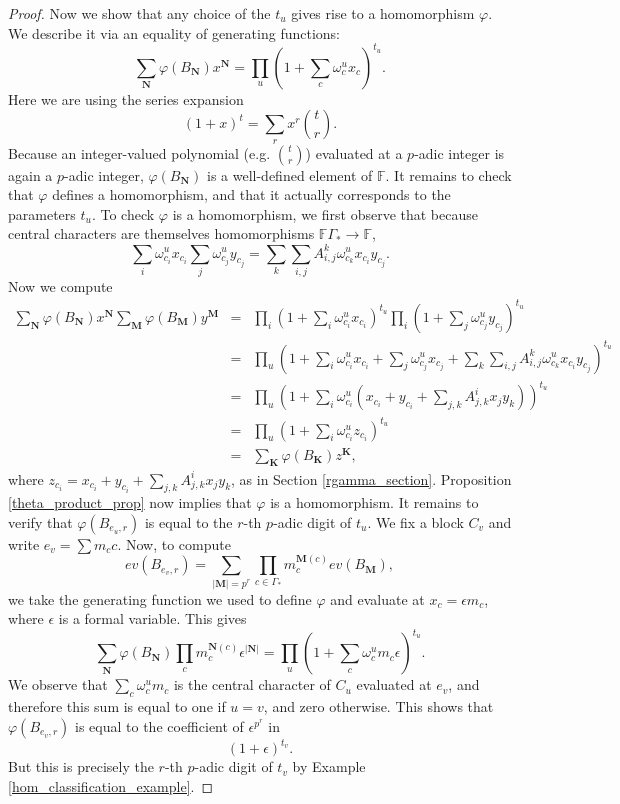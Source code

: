 \documentclass[ALCO,Unicode]{cedram}
\begin{document}
\begin{proof}
Now we show that any choice of the $t_u$ gives rise to a homomorphism $\varphi$. We describe it via an equality of generating functions:
\[
\sum_{\mathbf{N}} \varphi(B_{\mathbf{N}}) x^{\mathbf{N}} = \prod_u (1 + \sum_c \omega_c^{u} x_c)^{t_u}.
\]
Here we are using the series expansion
\[
(1 + x)^t = \sum_r x^r \binom{t}{r}.
\]
Because an integer-valued polynomial (e.g. $\binom{t}{r}$) evaluated at a $p$-adic integer is again a $p$-adic integer, $\varphi(B_{\mathbf{N}})$ is a well-defined element of $\mathbb{F}$. It remains to check that $\varphi$ defines a homomorphism, and that it actually corresponds to the parameters $t_u$. To check $\varphi$ is a homomorphism, we first observe that because central characters are themselves homomorphisms $\mathbb{F}\Gamma_* \to \mathbb{F}$,
\[
\sum_{i} \omega_{c_i}^{u} x_{c_i}  \sum_{j} \omega_{c_j}^{u} y_{c_j} = 
\sum_k \sum_{i,j} A_{i,j}^k \omega_{c_k}^{u} x_{c_i}y_{c_j}.
\]
Now we compute
\begin{eqnarray*}
\sum_{\mathbf{N}} \varphi(B_{\mathbf{N}}) x^{\mathbf{N}} \sum_{\mathbf{M}} \varphi(B_{\mathbf{M}}) y^{\mathbf{M}} 
&=& \prod_i (1 + \sum_i \omega_{c_i}^{u} x_{c_i})^{t_u}\prod_i (1 + \sum_j \omega_{c_j}^{u} y_{c_j})^{t_u} \\
&=& \prod_u (1 + \sum_i \omega_{c_i}^{u} x_{c_i} + \sum_j \omega_{c_j}^{u} x_{c_j} + \sum_k \sum_{i,j} A_{i,j}^k \omega_{c_k}^{u} x_{c_i} y_{c_j})^{t_u} \\
&=& \prod_u (1 + \sum_i \omega_{c_i}^{u} (x_{c_i}+ y_{c_i} + \sum_{j,k} A_{j,k}^i x_jy_k))^{t_u} \\
&=& \prod_u (1 + \sum_i \omega_{c_i}^{u} z_{c_i})^{t_u} \\
&=& \sum_{\mathbf{K}} \varphi(B_{\mathbf{K}}) z^{\mathbf{K}},
\end{eqnarray*}
where $z_{c_i} = x_{c_i}+ y_{c_i} + \sum_{j,k} A_{j,k}^i x_jy_k$, as in Section \ref{rgamma_section}. Proposition \ref{theta_product_prop} now implies that $\varphi$ is a homomorphism. It remains to verify that $\varphi(B_{e_u, r})$ is equal to the $r$-th $p$-adic digit of $t_u$. We fix a block $C_v$ and write $e_v = \sum m_c c$. Now, to compute
\[
ev(B_{e_v,r}) = \sum_{|\mathbf{M}| = p^r} \prod_{c \in \Gamma_*} m_c^{\mathbf{M}(c)} ev(B_{\mathbf{M}}),
\]
we take the generating function we used to define $\varphi$ and evaluate at $x_c = \epsilon m_c$, where $\epsilon$ is a formal variable. This gives
\[
\sum_{\mathbf{N}} \varphi(B_{\mathbf{N}}) \prod_c m_c^{\mathbf{N}(c)} \epsilon^{|\mathbf{N}|} = \prod_u (1 + \sum_c \omega_c^{u} m_c \epsilon)^{t_u}.
\]
We observe that $\sum_{c} \omega_c^{u} m_c$ is the central character of $C_u$ evaluated at $e_v$, and therefore this sum is equal to one if $u = v$, and zero otherwise. This shows that $\varphi(B_{e_v, r})$ is equal to the coefficient of $\epsilon^{p^r}$ in
\[
(1 + \epsilon)^{t_v}.
\]
But this is precisely the $r$-th $p$-adic digit of $t_v$ by Example \ref{hom_classification_example}.
\end{proof}




\end{document}
